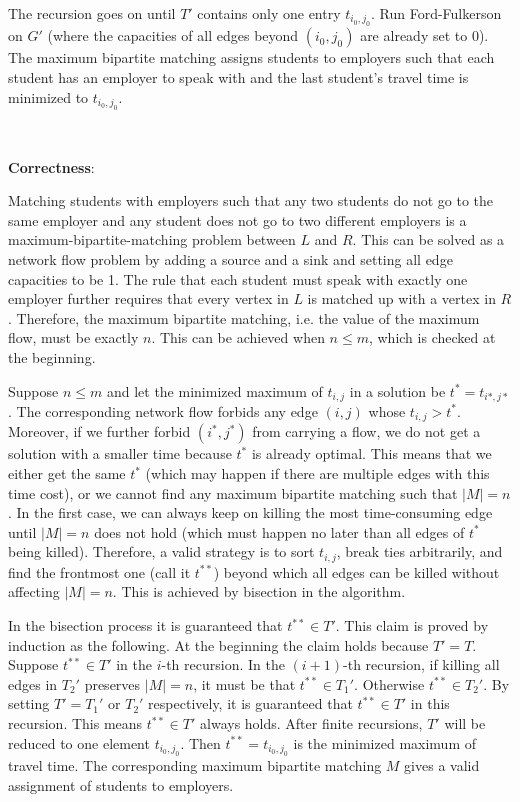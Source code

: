 \documentclass{article}
\begin{document}
The recursion goes on until $T'$ contains only one entry $t_{i_0,j_0}$. Run Ford-Fulkerson on $G'$ (where the capacities of all edges beyond $(i_0,j_0)$ are already set to 0). The maximum bipartite matching assigns students to employers such that each student has an employer to speak with and the last student's travel time is minimized to $t_{i_0,j_0}$.

~

\noindent\textbf{Correctness}:

Matching students with employers such that any two students do not go to the same employer and any student does not go to two different employers is a maximum-bipartite-matching problem between $L$ and $R$. This can be solved as a network flow problem by adding a source and a sink and setting all edge capacities to be 1. The rule that each student must speak with exactly one employer further requires that every vertex in $L$ is matched up with a vertex in $R$. Therefore, the maximum bipartite matching, i.e. the value of the maximum flow, must be exactly $n$. This can be achieved when $n\leqslant m$, which is checked at the beginning.

Suppose $n\leqslant m$ and let the minimized maximum of $t_{i,j}$ in a solution be $t^*=t_{i*,j*}$. The corresponding network flow forbids any edge $(i,j)$ whose $t_{i,j}>t^*$. Moreover, if we further forbid $(i^*,j^*)$ from carrying a flow, we do not get a solution with a smaller time because $t^*$ is already optimal. This means that we either get the same $t^*$ (which may happen if there are multiple edges with this time cost), or we cannot find any maximum bipartite matching such that $|M|=n$. In the first case, we can always keep on killing the most time-consuming edge until $|M|=n$ does not hold (which must happen no later than all edges of $t^*$ being killed). Therefore, a valid strategy is to sort $t_{i,j}$, break ties arbitrarily, and find the frontmost one (call it $t^{**}$) beyond which all edges can be killed without affecting $|M|=n$. This is achieved by bisection in the algorithm.

In the bisection process it is guaranteed that $t^{**}\in T'$. This claim is proved by induction as the following. At the beginning the claim holds because $T'=T$. Suppose $t^{**}\in T'$ in the $i$-th recursion. In the $(i+1)$-th recursion, if killing all edges in $T_2'$ preserves $|M|=n$, it must be that $t^{**}\in T_1'$. Otherwise $t^{**}\in T_2'$. By setting $T'=T_1'$ or $T_2'$ respectively, it is guaranteed that $t^{**}\in T'$ in this recursion. This means $t^{**}\in T'$ always holds. After finite recursions, $T'$ will be reduced to one element $t_{i_0,j_0}$. Then $t^{**}=t_{i_0,j_0}$ is the minimized maximum of travel time. The corresponding maximum bipartite matching $M$ gives a valid assignment of students to employers.
\end{document}
